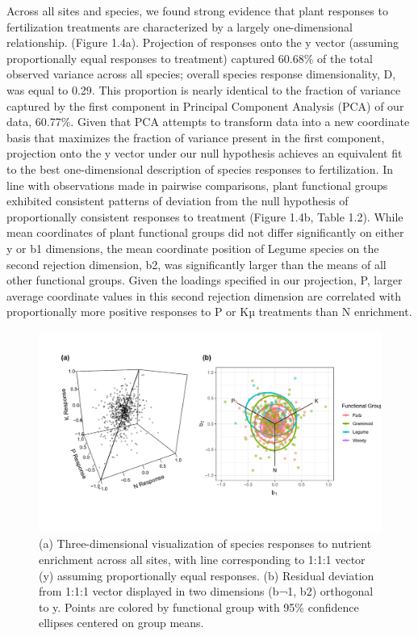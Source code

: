\documentclass[twoside,12pt,final]{ucthesis-CA2012}
\begin{document}
\begin{ucmainmatter}
Across all sites and species, we found strong evidence that plant responses to fertilization treatments are characterized by a largely one-dimensional relationship. (Figure 1.4a). Projection of responses onto the y vector (assuming proportionally equal responses to treatment) captured 60.68\% of the total observed variance across all species; overall species response dimensionality, D, was equal to 0.29. This proportion is nearly identical to the fraction of variance captured by the first component in Principal Component Analysis (PCA) of our data, 60.77\%. Given that PCA attempts to transform data into a new coordinate basis that maximizes the fraction of variance present in the first component, projection onto the y vector under our null hypothesis achieves an equivalent fit to the best one-dimensional description of species responses to fertilization.
In line with observations made in pairwise comparisons, plant functional groups exhibited consistent patterns of deviation from the null hypothesis of proportionally consistent responses to treatment (Figure 1.4b, Table 1.2). While mean coordinates of plant functional groups did not differ significantly on either y or b1 dimensions, the mean coordinate position of Legume species on the second rejection dimension, b2, was significantly larger than the means of all other functional groups. Given the loadings specified in our projection, P, larger average coordinate values in this second rejection dimension are correlated with proportionally more positive responses to P or Kµ treatments than N enrichment.
\begin{figure}
\centering
\includegraphics[width=\textwidth,height=0.45\textheight]{figure/Fig1_4.png}
\caption{\newline (a) Three-dimensional visualization of species responses to nutrient enrichment across all sites, with line corresponding to 1:1:1 vector (y) assuming proportionally equal responses. \newline (b) Residual deviation from 1:1:1 vector displayed in two dimensions (b¬1, b2) orthogonal to y. Points are colored by functional group with 95\% confidence ellipses centered on group means. \label{fig-1-4}}

\end{figure}
\end{ucmainmatter}
\end{document}
